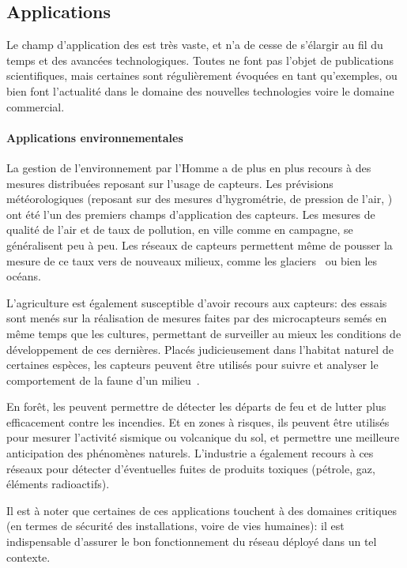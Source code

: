     \subsection{Applications}
Le champ d'application des \WSN est très vaste, et n'a de cesse de s'élargir au fil du temps et des avancées technologiques.
Toutes ne font pas l'objet de publications scientifiques, mais certaines sont régulièrement évoquées en tant qu'exemples, ou bien font l'actualité dans le domaine des nouvelles technologies voire le domaine commercial.

        \paragraph{Applications environnementales}
La gestion de l'environnement par l'Homme a de plus en plus recours à des mesures distribuées reposant sur l'usage de capteurs.
Les prévisions météorologiques (reposant sur des mesures d'hygrométrie, de pression de l'air, \etc) ont été l'un des premiers champs d'application des capteurs.
Les mesures de qualité de l'air et de taux de pollution, en ville comme en campagne, se généralisent peu à peu.
Les réseaux de capteurs permettent même de pousser la mesure de ce taux vers de nouveaux milieux, comme les glaciers~\cite{MPROH05} ou bien les océans.

L'agriculture est également susceptible d'avoir recours aux capteurs: des essais sont menés sur la réalisation de mesures faites par des microcapteurs semés en même temps que les cultures, permettant de surveiller au mieux les conditions de développement de ces dernières.
Placés judicieusement dans l'habitat naturel de certaines espèces, les capteurs peuvent être utilisés pour suivre et analyser le comportement de la faune d'un milieu~\cite{KDA14}.

En forêt, les \rcs peuvent permettre de détecter les départs de feu et de lutter plus efficacement contre les incendies.
Et en zones à risques, ils peuvent être utilisés pour mesurer l'activité sismique ou volcanique du sol, et permettre une meilleure anticipation des phénomènes naturels.
L'industrie a également recours à ces réseaux pour détecter d'éventuelles fuites de produits toxiques (pétrole, gaz, éléments radioactifs).

Il est à noter que certaines de ces applications touchent à des domaines critiques (en termes de sécurité des installations, voire de vies humaines): il est indispensable d'assurer le bon fonctionnement du réseau déployé dans un tel contexte.

